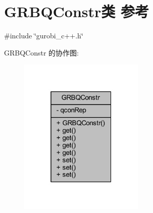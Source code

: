 \hypertarget{classGRBQConstr}{}\section{G\+R\+B\+Q\+Constr类 参考}
\label{classGRBQConstr}


{\ttfamily \#include \char`\"{}gurobi\+\_\+c++.\+h\char`\"{}}



G\+R\+B\+Q\+Constr 的协作图\+:
\nopagebreak
\begin{figure}[H]
\begin{center}
\leavevmode
\includegraphics[width=169pt]{classGRBQConstr__coll__graph}
\end{center}
\end{figure}
